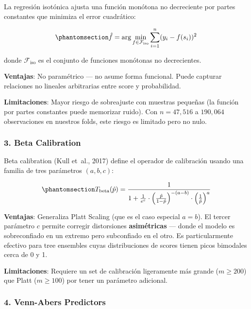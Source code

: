 \documentclass[
  spanish,
  11pt,
  letterpaper,
]{scrbook}
\theoremstyle{plain}
\theoremstyle{remark}
\begin{document}
La regresión isotónica ajusta una función monótona no decreciente por
partes constantes que minimiza el error cuadrático:

\begin{equation}\protect\phantomsection\label{eq-isotonic}{
\hat{f} = \arg\min_{f \in \mathcal{F}_{\text{iso}}} \sum_{i=1}^{n} (y_i - f(s_i))^2
}\end{equation}

donde \(\mathcal{F}_{\text{iso}}\) es el conjunto de funciones monótonas
no decrecientes.

\textbf{Ventajas}: No paramétrico --- no asume forma funcional. Puede
capturar relaciones no lineales arbitrarias entre score y probabilidad.

\textbf{Limitaciones}: Mayor riesgo de sobreajuste con muestras pequeñas
(la función por partes constantes puede memorizar ruido). Con
\(n = 47{,}516\) a \(190{,}064\) observaciones en nuestros folds, este
riesgo es limitado pero no nulo.

\subsubsection{3. Beta Calibration}\label{beta-calibration}

Beta calibration (Kull et~al., 2017) define el operador de calibración
usando una familia de tres parámetros \((a, b, c)\):

\begin{equation}\protect\phantomsection\label{eq-beta-calibration}{
T_{\text{beta}}(\hat{p}) = \frac{1}{1 + \frac{1}{e^c} \cdot \left(\frac{\hat{p}}{1 - \hat{p}}\right)^{-(a-b)} \cdot \left(\frac{1}{\hat{p}}\right)^a}
}\end{equation}

\textbf{Ventajas}: Generaliza Platt Scaling (que es el caso especial
\(a = b\)). El tercer parámetro \(c\) permite corregir distorsiones
\textbf{asimétricas} --- donde el modelo es sobreconfiado en un extremo
pero subconfiado en el otro. Es particularmente efectivo para tree
ensembles cuyas distribuciones de scores tienen picos bimodales cerca de
0 y 1.

\textbf{Limitaciones}: Requiere un set de calibración ligeramente más
grande (\(m \geq 200\)) que Platt (\(m \geq 100\)) por tener un
parámetro adicional.

\subsubsection{4. Venn-Abers Predictors}\label{venn-abers-predictors}
\end{document}
